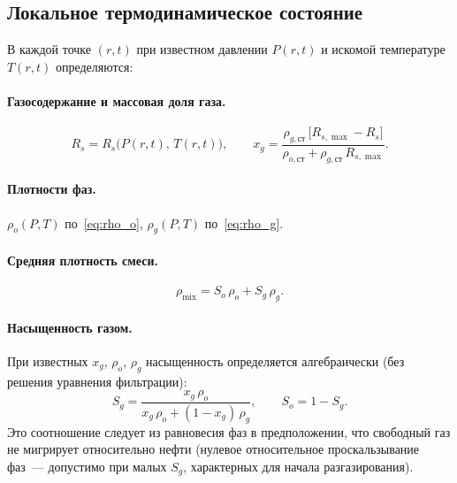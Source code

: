 \documentclass[12pt,a4paper]{article}
\begin{document}
\subsection{Локальное термодинамическое состояние}

В каждой точке $(r,t)$ при известном давлении $P(r,t)$ и искомой
температуре $T(r,t)$ определяются:

\paragraph{Газосодержание и массовая доля газа.}
\begin{equation}\label{eq:Rs_local}
  R_s = R_s\bigl(P(r,t),\,T(r,t)\bigr), \qquad
  x_g = \frac{\rho_{g,\text{ст}}\,\bigl[R_{s,\max} - R_s\bigr]}
             {\rho_{o,\text{ст}} + \rho_{g,\text{ст}}\,R_{s,\max}}.
\end{equation}

\paragraph{Плотности фаз.}
$\rho_o(P,T)$ по~\eqref{eq:rho_o}, $\rho_g(P,T)$ по~\eqref{eq:rho_g}.

\paragraph{Средняя плотность смеси.}
\begin{equation}\label{eq:rho_mix}
  \rho_{\mathrm{mix}} = S_o\,\rho_o + S_g\,\rho_g.
\end{equation}

\paragraph{Насыщенность газом.}
При известных $x_g$, $\rho_o$, $\rho_g$ насыщенность определяется
алгебраически (без решения уравнения фильтрации):
\begin{equation}\label{eq:Sg_from_xg}
  S_g = \frac{x_g\,\rho_o}{x_g\,\rho_o + (1-x_g)\,\rho_g}, \qquad
  S_o = 1 - S_g.
\end{equation}
Это соотношение следует из равновесия фаз в предположении, что свободный
газ не мигрирует относительно нефти (нулевое относительное проскальзывание
фаз~--- допустимо при малых $S_g$, характерных для начала разгазирования).
\end{document}
